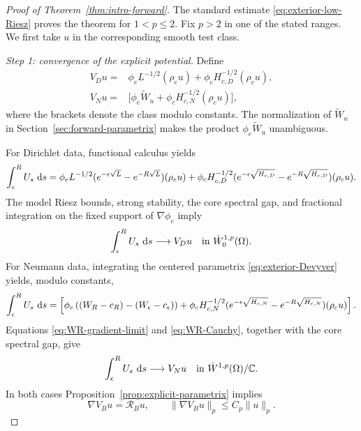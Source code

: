 \documentclass[12pt]{amsart}
\newcommand\dd{\,{\rm d}}
\theoremstyle{remark}
\begin{document}
\begin{proof}[Proof of Theorem~\ref{thm:intro-forward}]
The standard estimate \eqref{eq:exterior-low-Riesz} proves the theorem for
\(1<p\leq2\).  Fix \(p>2\) in one of the stated ranges.  We first take
\(u\) in the corresponding smooth test class. 

\emph{Step 1: convergence of the explicit potential.}
Define
\begin{align*}
 V_Du={}&\phi_eL^{-1/2}(\rho_eu)
          +\phi_cH_{c,D}^{-1/2}(\rho_cu),\\
 V_Nu={}&\bigl[\phi_e\widetilde W_u
          +\phi_cH_{c,N}^{-1/2}(\rho_cu)\bigr],
\end{align*}
where the brackets denote the class modulo constants.  The normalization
of \(\widetilde W_u\) in Section~\ref{sec:forward-parametrix} makes the
product \(\phi_e\widetilde W_u\) unambiguous.

For Dirichlet data, functional calculus yields
\begin{align*}
 \int_\epsilon^R U_s\,\dd s
 =\phi_eL^{-1/2}
       (e^{-\epsilon\sqrt L}-e^{-R\sqrt L})(\rho_eu)+\phi_cH_{c,D}^{-1/2}
       (e^{-\epsilon\sqrt{H_{c,D}}}
        -e^{-R\sqrt{H_{c,D}}})(\rho_cu).
\end{align*}
The model Riesz bounds, strong stability, the core spectral gap, and
fractional integration on the fixed support of \(\nabla\phi_e\) imply
\[
 \int_\epsilon^R U_s\,\dd s\longrightarrow V_Du
 \quad\text{in }\dot W^{1,p}_0(\Omega).
\]
For Neumann data, integrating the centered parametrix
\eqref{eq:exterior-Devyver} yields, modulo constants,
\begin{align*}
 \int_\epsilon^R U_s\,\dd s
 =\left[{}\phi_e \left((W_R-c_R)-(W_\epsilon-c_\epsilon) \right) +\phi_cH_{c,N}^{-1/2}
       (e^{-\epsilon\sqrt{H_{c,N}}}
        -e^{-R\sqrt{H_{c,N}}})(\rho_cu)\right].
\end{align*}
Equations \eqref{eq:WR-gradient-limit} and \eqref{eq:WR-Cauchy}, together
with the core spectral gap, give
\[
 \int_\epsilon^R U_s\,\dd s\longrightarrow V_Nu
 \quad\text{in }\dot W^{1,p}(\Omega)/\mathbb C.
\]
In both cases Proposition~\ref{prop:explicit-parametrix} implies
\begin{equation}\label{eq:explicit-potential-gradient}
 \nabla V_Bu=\mathcal R_Bu,\qquad
 \|\nabla V_Bu\|_p\leq C_p\|u\|_p.
\end{equation}


\end{proof}
\end{document}
